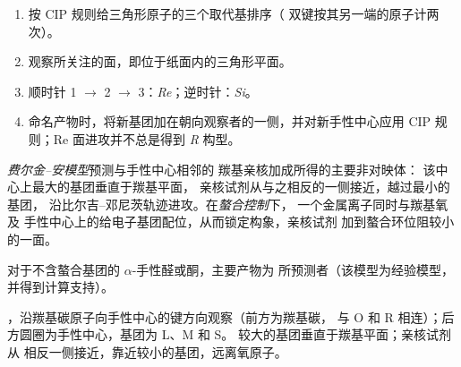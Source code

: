 \begin{method}[标注 Re 面与 Si 面]\label{met:b3:asymmetric-synthesis:re-si}
\begin{enumerate}
  \item 按 CIP 规则给三角形原子的三个取代基排序（
        双键按其另一端的原子计两次）。
  \item 观察所关注的面，即位于纸面内的三角形平面。
  \item 顺时针 1 $\to$ 2 $\to$ 3：\textit{Re}；逆时针：\textit{Si}。
  \item 命名产物时，将新基团加在朝向观察者的一侧，并对新手性中心应用
        CIP 规则；Re 面进攻并不总是得到 \textit{R} 构型。
\end{enumerate}
\end{method}

\begin{definition}\label{def:b3:asymmetric-synthesis:felkin}
\emph{费尔金–安模型}预测与手性中心相邻的
羰基亲核加成所得的主要非对映体：
该中心上最大的基团垂直于羰基平面，
亲核试剂从与之相反的一侧接近，越过最小的基团，
沿比尔吉–邓尼茨轨迹进攻。在\emph{螯合控制}下，
一个金属离子同时与羰基氧及
手性中心上的给电子基团配位，从而锁定构象，亲核试剂
加到螯合环位阻较小的一面。
\end{definition}

\begin{proposition}\label{prop:b3:asymmetric-synthesis:felkin}
对于不含螯合基团的 $\alpha$-手性醛或酮，主要产物为
所预测者（该模型为经验模型，
并得到计算支持）。\admitted
\end{proposition}

\begin{omfigure}

{\small {}，沿羰基碳原子向手性中心的键方向观察（前方为羰基碳，
与 O 和 R 相连）；后方圆圈为手性中心，基团为 L、M 和 S。
较大的基团垂直于羰基平面；亲核试剂从
相反一侧接近，靠近较小的基团，远离氧原子。}
\end{omfigure}

